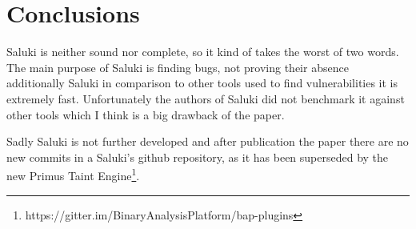 \documentclass[a4paper, 12pt, journal, onecolumn]{IEEEtran}
\begin{document}
\section{Conclusions}

Saluki is neither sound nor complete, so it kind of takes the worst of two words. The main purpose of Saluki is finding bugs, not proving their absence additionally Saluki in comparison to other tools used to find vulnerabilities it is extremely fast. Unfortunately the authors of Saluki did not benchmark it against other tools which I think is a big drawback of the paper. 

Sadly Saluki is not further developed and after publication the paper \cite{saluki} there are no new commits in a Saluki's github repository, as it has been superseded by the new Primus Taint Engine\footnote{https://gitter.im/BinaryAnalysisPlatform/bap-plugins}. 

\newpage



\end{document}
